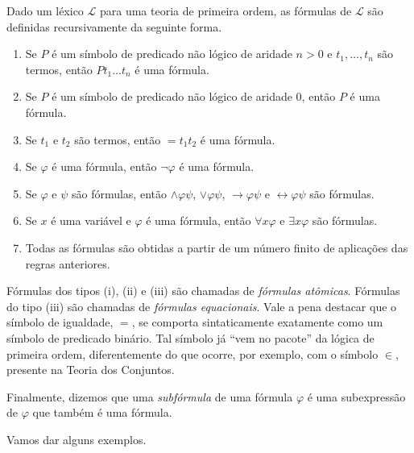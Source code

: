 \begin{metadefinition}\label{mdef:formulasPrimeiraOrdem}
    Dado um léxico $\mathcal L$ para uma teoria de primeira ordem, as fórmulas de $\mathcal L$ são definidas recursivamente da seguinte forma.
\begin{enumerate}[label=(\roman*)]
    \item Se $P$ é um símbolo de predicado não lógico de aridade $n>0$ e $t_1,\dots,t_n$ são termos, então $Pt_1\dots t_n$ é uma fórmula.
    \item Se $P$ é um símbolo de predicado não lógico de aridade $0$, então $P$ é uma fórmula.
    \item Se $t_1$ e $t_2$ são termos, então ${=}t_1t_2$ é uma fórmula.
    \item Se $\varphi$ é uma fórmula, então $\neg\varphi$ é uma fórmula.
    \item Se $\varphi$ e $\psi$ são fórmulas, então ${\wedge}\varphi\psi$, ${\vee}\varphi\psi$, ${\rightarrow}\varphi\psi$ e ${\leftrightarrow}\varphi\psi$ são fórmulas.
    \item Se $x$ é uma variável e $\varphi$ é uma fórmula, então $\forall x\varphi$ e $\exists x\varphi$ são fórmulas.
    \item Todas as fórmulas são obtidas a partir de um número finito de aplicações das regras anteriores.
\end{enumerate}

Fórmulas dos tipos (i), (ii) e (iii) são chamadas de \emph{fórmulas atômicas}.
Fórmulas do tipo (iii) são chamadas de \emph{fórmulas equacionais}.
Vale a pena destacar que o símbolo de igualdade, $=$, se comporta sintaticamente exatamente como um símbolo de predicado binário.
Tal símbolo já ``vem no pacote'' da lógica de primeira ordem, diferentemente do que ocorre, por exemplo, com o símbolo $\in$, presente na Teoria dos Conjuntos.

Finalmente, dizemos que uma \emph{subfórmula} de uma fórmula $\varphi$ é uma subexpressão de $\varphi$ que também é uma fórmula.
\end{metadefinition}

Vamos dar alguns exemplos.

